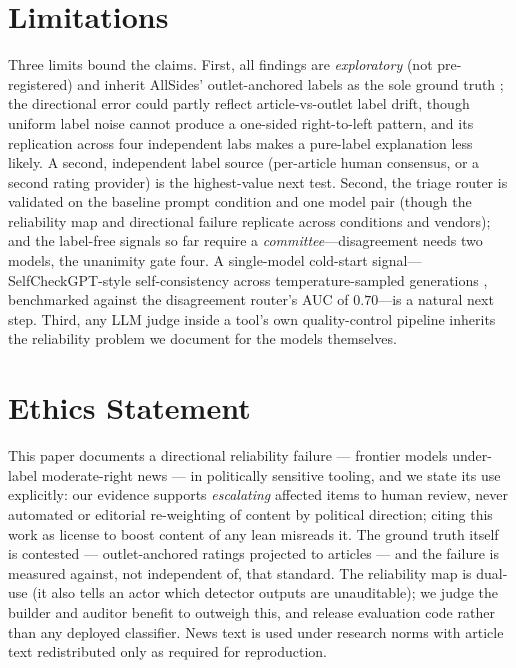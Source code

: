 \documentclass{article}
\begin{document}
\section{Limitations}
Three limits bound the claims. First, all findings are \emph{exploratory}
(not pre-registered) and inherit AllSides' outlet-anchored labels as the
sole ground truth \citep{baly2020detect}; the directional error could
partly reflect article-vs-outlet label drift, though uniform label noise
cannot produce a one-sided right-to-left pattern, and its replication
across four independent labs makes a pure-label explanation less likely.
A second, independent label source (per-article human consensus, or a
second rating provider) is the highest-value next test. Second, the
triage router is validated on the baseline prompt condition and one model
pair (though the reliability map and directional failure replicate across
conditions and vendors); and the label-free signals so far require a
\emph{committee}---disagreement needs two models, the unanimity gate four.
A single-model cold-start signal---SelfCheckGPT-style self-consistency
across temperature-sampled generations
\citep{manakul2023selfcheckgpt}, benchmarked against the disagreement
router's AUC of $0.70$---is a natural next step. Third, any LLM judge
inside a tool's own quality-control pipeline inherits the reliability
problem we document for the models themselves.

\section*{Ethics Statement}
This paper documents a directional reliability failure --- frontier
models under-label moderate-right news --- in politically sensitive
tooling, and we state its use explicitly: our evidence supports
\emph{escalating} affected items to human review, never automated or
editorial re-weighting of content by political direction; citing this
work as license to boost content of any lean misreads it. The ground
truth itself is contested --- outlet-anchored ratings projected to
articles --- and the failure is measured against, not independent of,
that standard. The reliability map is dual-use (it also tells an actor
which detector outputs are unauditable); we judge the builder and
auditor benefit to outweigh this, and release evaluation code rather
than any deployed classifier. News text is used under research norms
with article text redistributed only as required for reproduction.
\end{document}
